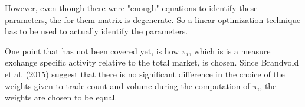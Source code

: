 \documentclass[a4paper,12pt]{article}
\newcommand{\E}{\mathrm{E}}
\newcommand{\Cov}{\mathrm{Cov}}
\begin{document}
      However, even though there were "enough" equations to identify these parameters, the for them matrix is degenerate. So a linear optimization technique has to be used to actually identify the parameters.

      One point that has not been covered yet, is how $\pi_i$, which is is a measure exchange specific activity relative to the total market, is chosen. Since Brandvold et al. (2015) suggest that there is no significant difference in the choice of the weights given to trade count and volume during the computation of $\pi_i$, the weights are chosen to be equal.



\end{document}
